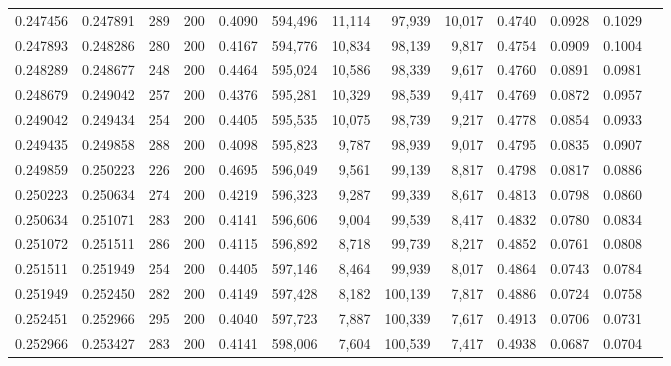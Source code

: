 \begin{tabular}{rrrrrrrrrrrrr}
0.247456 & 0.247891 &    289 & 200 &                                     0.4090 & 594,496 &  11,114 &  97,939 &  10,017 & 0.4740 & 0.0928 & 0.1029 \\
0.247893 & 0.248286 &    280 & 200 &                                     0.4167 & 594,776 &  10,834 &  98,139 &   9,817 & 0.4754 & 0.0909 & 0.1004 \\
0.248289 & 0.248677 &    248 & 200 &                                     0.4464 & 595,024 &  10,586 &  98,339 &   9,617 & 0.4760 & 0.0891 & 0.0981 \\
0.248679 & 0.249042 &    257 & 200 &                                     0.4376 & 595,281 &  10,329 &  98,539 &   9,417 & 0.4769 & 0.0872 & 0.0957 \\
0.249042 & 0.249434 &    254 & 200 &                                     0.4405 & 595,535 &  10,075 &  98,739 &   9,217 & 0.4778 & 0.0854 & 0.0933 \\
0.249435 & 0.249858 &    288 & 200 &                                     0.4098 & 595,823 &   9,787 &  98,939 &   9,017 & 0.4795 & 0.0835 & 0.0907 \\
0.249859 & 0.250223 &    226 & 200 &                                     0.4695 & 596,049 &   9,561 &  99,139 &   8,817 & 0.4798 & 0.0817 & 0.0886 \\
0.250223 & 0.250634 &    274 & 200 &                                     0.4219 & 596,323 &   9,287 &  99,339 &   8,617 & 0.4813 & 0.0798 & 0.0860 \\
0.250634 & 0.251071 &    283 & 200 &                                     0.4141 & 596,606 &   9,004 &  99,539 &   8,417 & 0.4832 & 0.0780 & 0.0834 \\
0.251072 & 0.251511 &    286 & 200 &                                     0.4115 & 596,892 &   8,718 &  99,739 &   8,217 & 0.4852 & 0.0761 & 0.0808 \\
0.251511 & 0.251949 &    254 & 200 &                                     0.4405 & 597,146 &   8,464 &  99,939 &   8,017 & 0.4864 & 0.0743 & 0.0784 \\
0.251949 & 0.252450 &    282 & 200 &                                     0.4149 & 597,428 &   8,182 & 100,139 &   7,817 & 0.4886 & 0.0724 & 0.0758 \\
0.252451 & 0.252966 &    295 & 200 &                                     0.4040 & 597,723 &   7,887 & 100,339 &   7,617 & 0.4913 & 0.0706 & 0.0731 \\
0.252966 & 0.253427 &    283 & 200 &                                     0.4141 & 598,006 &   7,604 & 100,539 &   7,417 & 0.4938 & 0.0687 & 0.0704 \\

\end{tabular}
